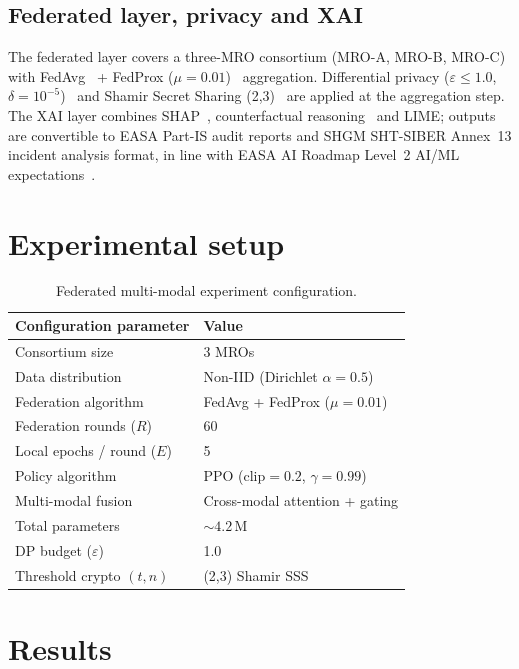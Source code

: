 \documentclass[11pt]{article}
\begin{document}
\subsection{Federated layer, privacy and XAI}
The federated layer covers a three-MRO consortium (MRO-A, MRO-B, MRO-C) with FedAvg~\cite{mcmahan2017} + FedProx ($\mu=0.01$)~\cite{li2020} aggregation. Differential privacy ($\varepsilon \le 1.0$, $\delta = 10^{-5}$)~\cite{dwork2014} and Shamir Secret Sharing (2,3)~\cite{shamir1979} are applied at the aggregation step. The XAI layer combines SHAP~\cite{lundberg2017}, counterfactual reasoning~\cite{wachter2017} and LIME; outputs are convertible to EASA Part-IS audit reports and SHGM SHT-SIBER Annex~13 incident analysis format, in line with EASA AI Roadmap Level~2 AI/ML expectations~\cite{easaai}.

\section{Experimental setup}
\begin{table}[ht]\centering\small
\caption{Federated multi-modal experiment configuration.}
\begin{tabular}{ll}
\toprule
\textbf{Configuration parameter} & \textbf{Value}\\
\midrule
Consortium size & 3 MROs\\
Data distribution & Non-IID (Dirichlet $\alpha=0.5$)\\
Federation algorithm & FedAvg + FedProx ($\mu=0.01$)\\
Federation rounds ($R$) & 60\\
Local epochs / round ($E$) & 5\\
Policy algorithm & PPO (clip${}=0.2$, $\gamma=0.99$)\\
Multi-modal fusion & Cross-modal attention + gating\\
Total parameters & ${\sim}4.2$\,M\\
DP budget ($\varepsilon$) & 1.0\\
Threshold crypto $(t,n)$ & (2,3) Shamir SSS\\
\bottomrule
\end{tabular}
\end{table}

\section{Results}
\end{document}
